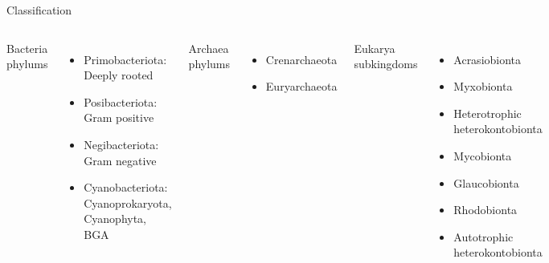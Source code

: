 \documentclass[ignorenonframetext,aspectratio=169]{beamer}
\begin{document}
\begin{frame}{Classification}
\protect\hypertarget{classification}{}

\begin{columns}[T,onlytextwidth]
  \alert{Bacteria} phylums \\
  \begin{itemize}
  \item Primobacteriota: Deeply rooted
  \item Posibacteriota: Gram positive
  \item Negibacteriota: Gram negative
  \item Cyanobacteriota: Cyanoprokaryota, Cyanophyta, BGA
  \end{itemize}
  
  \alert{Archaea} phylums \\  
  \begin{itemize}
  \item Crenarchaeota
  \item Euryarchaeota
  \end{itemize}
 
  \alert{Eukarya} subkingdoms \\
  \begin{itemize}
  \item Acrasiobionta
  \item Myxobionta
  \item Heterotrophic heterokontobionta
  \item Mycobionta
  \item Glaucobionta
  \item Rhodobionta
  \item Autotrophic heterokontobionta
  \end{itemize}
  
\end{columns}

\end{frame}
\end{document}
